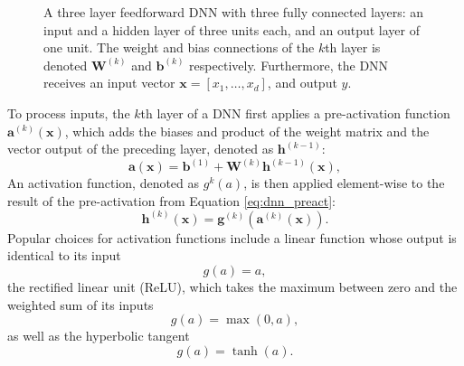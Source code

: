 \begin{figure}[htb!]
    \centering
    
    \caption[A feed forward neural network]{
    A three layer feedforward DNN with three fully connected layers: an input and a hidden layer of three units each, and an output layer of one unit. 
    The weight and bias connections of the $k$th layer is denoted $\mathbf{W}^{(k)}$ and $\mathbf{b}^{(k)}$ respectively.
    Furthermore, the DNN receives an input vector $\bm{x}=[x_1, \ldots ,x_d]$, and output $\hat{y}$.}
    \label{fig:neural_network}
\end{figure}




To process inputs, the $k$th layer of a DNN first applies a pre-activation function $\bm{a}^{(k)}(\bm{x})$, 
which adds the biases and product of the weight matrix and the vector output of the preceding layer, denoted as $\mathbf{h}^{(k-1)}$:
\begin{equation}\label{eq:dnn_preact}
    \bm{a}(\bm{x}) = \mathbf{b}^{(1)} + \mathbf{W}^{(k)} \mathbf{h}^{(k-1)}(\bm{x}),
\end{equation}
An activation function, denoted as $g^{k}(a)$, is then applied element-wise to the result of the pre-activation from Equation \ref{eq:dnn_preact}:
\begin{equation}\label{eq:dnn_act}
    \mathbf{h}^{(k)}(\bm{x}) = \bm{g}^{(k)}( \bm{a}^{(k)} (\bm{x}) ).
\end{equation}
Popular choices for activation functions include a linear function whose output is identical to its input
\begin{equation}
    g(a) = a,
    \label{eq:linear_act}
\end{equation}
the rectified linear unit (ReLU), which takes the maximum between zero and the weighted sum of its inputs
\begin{equation}
    g(a) = \max(0,a),
    \label{eq:ReLU_act}
\end{equation}
as well as the hyperbolic tangent
\begin{equation}
    g(a) = \tanh(a).
    \label{eq:tanh_act}
\end{equation}



